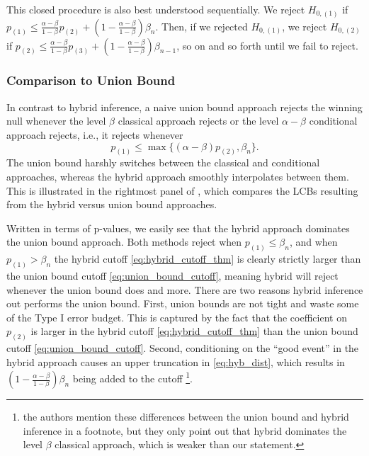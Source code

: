 \documentclass{article}
\begin{document}
This closed procedure is also best understood sequentially. We reject $H_{0, (1)}$ if $p_{(1)} \leq \frac{\alpha - \beta}{1-\beta} p_{(2)} + (1 - \frac{\alpha - \beta}{1-\beta}) \beta_n$. Then, if we rejected $H_{0, (1)}$, we reject $H_{0, (2)}$ if $p_{(2)} \leq  \frac{\alpha - \beta}{1-\beta} p_{(3)} + (1 - \frac{\alpha -\beta }{1-\beta}) \beta_{n-1}$, so on and so forth until we fail to reject.  


\subsubsection{Comparison to Union Bound}

In contrast to hybrid inference, a naive union bound approach rejects the winning null whenever the level $\beta$ classical approach rejects or the level $\alpha -\beta$ conditional approach rejects, i.e., it rejects whenever 
\begin{equation}
    \label{eq:union_bound_cutoff}
    p_{(1)} \leq \max\{(\alpha - \beta) p_{(2)}, \beta_n\}.
\end{equation}
The union bound harshly switches between the classical and conditional approaches, whereas the hybrid approach smoothly interpolates between them. This is illustrated in the rightmost panel of , which compares the LCBs resulting from the hybrid versus union bound approaches. 

Written in terms of p-values, we easily see that the hybrid approach dominates the union bound approach. Both methods reject when $p_{(1)} \leq \beta_n$, and when $p_{(1)} > \beta_n$  the hybrid cutoff \eqref{eq:hybrid_cutoff_thm} is clearly strictly larger than the union bound cutoff \eqref{eq:union_bound_cutoff}, meaning hybrid will reject whenever the union bound does and more. There are two reasons hybrid inference out performs the union bound. First, union bounds are not tight and waste some of the Type I error budget. This is captured by the fact that the coefficient on $p_{(2)}$ is larger in the hybrid cutoff \eqref{eq:hybrid_cutoff_thm} than the union bound cutoff \eqref{eq:union_bound_cutoff}.  Second, conditioning on the ``good event'' in the hybrid approach causes an upper truncation in \eqref{eq:hyb_dist}, which results in $\left(1 - \frac{\alpha - \beta}{1 - \beta}\right)\beta_n$ being added to the cutoff \footnote{the authors \cite{Andrews2023} mention these differences between the union bound and hybrid inference in a footnote, but they only point out that hybrid dominates the level $\beta$ classical approach, which is weaker than our statement.}.
\end{document}
